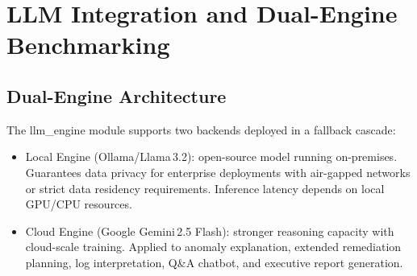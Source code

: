\documentclass[5p, times]{elsarticle}
\begin{document}
\begin{table}[h!]
\centering
\caption{5-Fold CV F1 comparison for all models}
\label{tab:cv_synth}
\end{table}

\section{LLM Integration and Dual-Engine Benchmarking}\label{sec7}

\subsection{Dual-Engine Architecture}
The llm\_engine module supports two backends deployed in a fallback cascade:
\begin{itemize}[leftmargin=*, topsep=2pt, itemsep=1pt]
    \item Local Engine (Ollama/Llama\,3.2): open-source model running on-premises. Guarantees data privacy for enterprise deployments with air-gapped networks or strict data residency requirements. Inference latency depends on local
    GPU/CPU resources.
    \item Cloud Engine (Google Gemini\,2.5 Flash): stronger reasoning capacity with cloud-scale training. Applied to anomaly explanation, extended remediation planning, log interpretation, Q\&A chatbot, and executive report generation.
\end{itemize}
\end{document}

